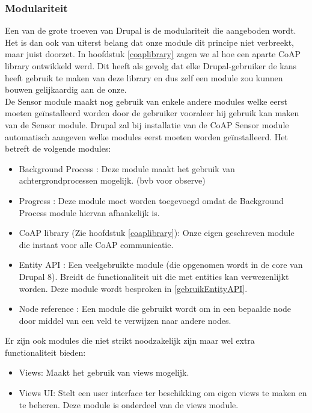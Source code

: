\subsubsection{Modulariteit}
Een van de grote troeven van Drupal is de modulariteit die aangeboden wordt. Het is dan ook van uiterst belang dat onze module dit principe niet verbreekt, maar juist doorzet. In hoofdstuk \ref{coaplibrary} zagen we al hoe een aparte CoAP library ontwikkeld werd. Dit heeft als gevolg dat elke Drupal-gebruiker de kans heeft gebruik te maken van deze library en dus zelf een module zou kunnen bouwen gelijkaardig aan de onze.\\
De Sensor module maakt nog gebruik van enkele andere modules welke eerst moeten ge\"{i}nstalleerd worden door de gebruiker vooraleer hij gebruik kan maken van de Sensor module. Drupal zal bij installatie van de CoAP Sensor module automatisch aangeven welke modules eerst moeten worden ge\"{i}nstalleerd. Het betreft de volgende modules:
\begin{itemize}
\item Background Process \cite{backgroundProcessModule}: Deze module maakt het gebruik van achtergrondprocessen mogelijk. (bvb voor observe)
\item Progress \cite{progressModule}: Deze module moet worden toegevoegd omdat de Background Process module hiervan afhankelijk is.
\item CoAP library (Zie hoofdstuk \ref{coaplibrary}): Onze eigen geschreven module die instaat voor alle CoAP communicatie.
\item Entity API \cite{entityApiModule}: Een veelgebruikte module (die opgenomen wordt in de core van Drupal 8). Breidt de functionaliteit uit die met entities kan verwezenlijkt worden. Deze module wordt besproken in \ref{gebruikEntityAPI}.
\item Node reference \cite{nodeReferenceModule}: Een module die gebruikt wordt om in een bepaalde node door middel van een veld te verwijzen naar andere nodes.
\end{itemize}

\noindent
Er zijn ook modules die niet strikt noodzakelijk zijn maar wel extra functionaliteit bieden:
\begin{itemize}
\item Views\cite{viewsModule}: Maakt het gebruik van views mogelijk.
\item Views UI: Stelt een user interface ter beschikking om eigen views te maken en te beheren. Deze module is onderdeel van de views module.
\end{itemize}

